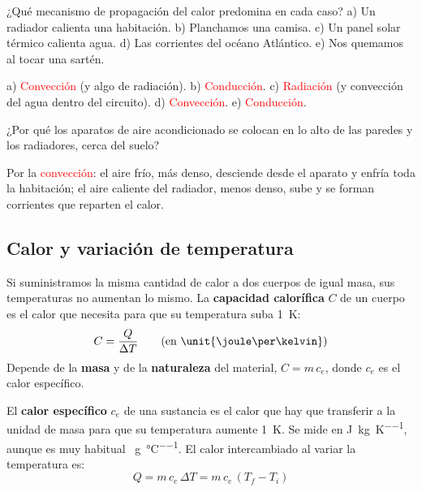 \begin{exercise}
    ¿Qué mecanismo de propagación del calor predomina en cada caso? a) Un radiador calienta una habitación. b) Planchamos una
    camisa. c) Un panel solar térmico calienta agua. d) Las corrientes del océano Atlántico. e) Nos quemamos al tocar una sartén.
    \begin{solu}
        a) \textcolor{red}{Convección} (y algo de radiación). b) \textcolor{red}{Conducción}. c) \textcolor{red}{Radiación} (y
        convección del agua dentro del circuito). d) \textcolor{red}{Convección}. e) \textcolor{red}{Conducción}.
    \end{solu}
\end{exercise}

\begin{exercise}
    ¿Por qué los aparatos de aire acondicionado se colocan en lo alto de las paredes y los radiadores, cerca del suelo?
    \begin{solu}
        Por la \textcolor{red}{convección}: el aire frío, más denso, desciende desde el aparato y enfría toda la habitación; el aire
        caliente del radiador, menos denso, sube y se forman corrientes que reparten el calor.
    \end{solu}
\end{exercise}

\subsection{Calor y variación de temperatura}

Si suministramos la misma cantidad de calor a dos cuerpos de igual masa, sus temperaturas no aumentan lo mismo. La
\textbf{capacidad calorífica} \(C\) de un cuerpo es el calor que necesita para que su temperatura suba \qty{1}{\kelvin}:
\[ C = \frac{Q}{\Delta T} \qquad \text{(en \unit{\joule\per\kelvin})} \]
Depende de la \textbf{masa} y de la \textbf{naturaleza} del material, \(C = m\,c_e\), donde \(c_e\) es el calor específico.

\begin{definition}
    El \textbf{calor específico} \(c_e\) de una sustancia es el calor que hay que transferir a la unidad de masa para que su
    temperatura aumente \qty{1}{\kelvin}. Se mide en \unit{\joule\per\kg\per\kelvin}, aunque es muy habitual
    \unit{\calorie\per\g\per\degreeCelsius}. El calor intercambiado al variar la temperatura es:
    \[ Q = m\,c_e\,\Delta T = m\,c_e\,(T_f - T_i) \]
\end{definition}

